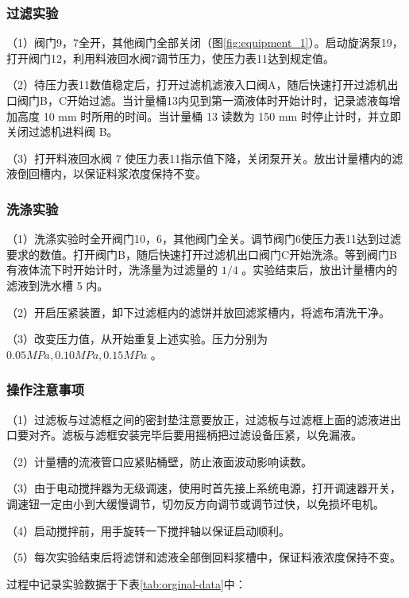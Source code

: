 \documentclass[UTF8,a4paper,fontset=none]{ctexart}
\begin{document}
\subsubsection{过滤实验}

（1）阀门9，7全开，其他阀门全部关闭（图\ref{fig:equipment_1}）。启动旋涡泵19，打开阀门12，利用料液回水阀7调节压力，使压力表11达到规定值。

（2）待压力表11数值稳定后，打开过滤机滤液入口阀A，随后快速打开过滤机出口阀门B，C开始过滤。当计量桶13内见到第一滴液体时开始计时，记录滤液每增加高度 10 mm 时所用的时间。当计量桶 13 读数为 150 mm 时停止计时，并立即关闭过滤机进料阀 B。

（3）打开料液回水阀 7 使压力表11指示值下降，关闭泵开关。放出计量槽内的滤液倒回槽内，以保证料浆浓度保持不变。

\subsubsection{洗涤实验}

（1）洗涤实验时全开阀门10，6，其他阀门全关。调节阀门6使压力表11达到过滤要求的数值。打开阀门B，随后快速打开过滤机出口阀门C开始洗涤。等到阀门B有液体流下时开始计时，洗涤量为过滤量的 $1 / 4$ 。实验结束后，放出计量槽内的滤液到洗水槽 5 内。

（2）开启压紧装置，卸下过滤框内的滤饼并放回滤浆槽内，将滤布清洗干净。

（3）改变压力值，从开始重复上述实验。压力分别为 $0.05 MPa,0.10 MPa, 0.15 MPa$ 。

\subsubsection{操作注意事项}

（1）过滤板与过滤框之间的密封垫注意要放正，过滤板与过滤框上面的滤液进出口要对齐。滤板与滤框安装完毕后要用摇柄把过滤设备压紧，以免漏液。

（2）计量槽的流液管口应紧贴桶壁，防止液面波动影响读数。

（3）由于电动搅拌器为无级调速，使用时首先接上系统电源，打开调速器开关，调速钮一定由小到大缓慢调节，切勿反方向调节或调节过快，以免损坏电机。

（4）启动搅拌前，用手旋转一下搅拌轴以保证启动顺利。

（5）每次实验结束后将滤饼和滤液全部倒回料浆槽中，保证料液浓度保持不变。

过程中记录实验数据于下表\ref{tab:orginal-data}中：
\end{document}
